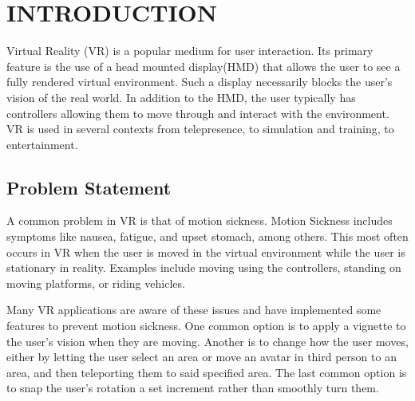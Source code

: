 %

\chapter{INTRODUCTION}
\label{ch:intro}


Virtual Reality (VR) is a popular medium for user interaction.
Its primary feature is the use of a head mounted display(HMD) that allows the user to see a fully rendered virtual environment.
Such a display necessarily blocks the user's vision of the real world.
In addition to the HMD, the user typically has controllers allowing them to move through and interact with the environment.
VR is used in several contexts from telepresence, to simulation and training, to entertainment. %

\section{Problem Statement}
\label{sec:problem_statement}

A common problem in VR is that of motion sickness.
Motion Sickness includes symptoms like nausea, fatigue, and upset stomach, among others.
This most often occurs in VR when the user is moved in the virtual environment while the user is stationary in reality.
Examples include moving using the controllers, standing on moving platforms, or riding vehicles.

Many VR applications are aware of these issues and have implemented some features to prevent motion sickness.
One common option is to apply a vignette to the user's vision when they are moving.
Another is to change how the user moves, either by letting the user select an area or move an avatar in third person to an area, and then teleporting them to said specified area.
The last common option is to snap the user's rotation a set increment rather than smoothly turn them.

